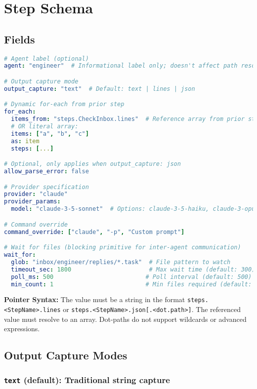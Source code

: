 \documentclass[11pt,a4paper]{article}
\begin{document}
\section{Step Schema}

\subsection{Fields}

\begin{lstlisting}[language=yaml, caption={Step Schema Fields}]
# Agent label (optional)
agent: "engineer"  # Informational label only; doesn't affect path resolution

# Output capture mode
output_capture: "text"  # Default: text | lines | json

# Dynamic for-each from prior step
for_each:
  items_from: "steps.CheckInbox.lines"  # Reference array from prior step
  # OR literal array:
  items: ["a", "b", "c"]
  as: item
  steps: [...]

# Optional, only applies when output_capture: json
allow_parse_error: false

# Provider specification
provider: "claude"
provider_params:
  model: "claude-3-5-sonnet"  # Options: claude-3-5-haiku, claude-3-opus-latest

# Command override
command_override: ["claude", "-p", "Custom prompt"]

# Wait for files (blocking primitive for inter-agent communication)
wait_for:
  glob: "inbox/engineer/replies/*.task"  # File pattern to watch
  timeout_sec: 1800                      # Max wait time (default: 300)
  poll_ms: 500                          # Poll interval (default: 500)
  min_count: 1                          # Min files required (default: 1)
\end{lstlisting}

\textbf{Pointer Syntax:} The value must be a string in the format \texttt{steps.<StepName>.lines} or \texttt{steps.<StepName>.json[.<dot.path>]}. The referenced value must resolve to an array. Dot-paths do not support wildcards or advanced expressions.

\subsection{Output Capture Modes}

\subsubsection{\texttt{text} (default): Traditional string capture}
\end{document}
